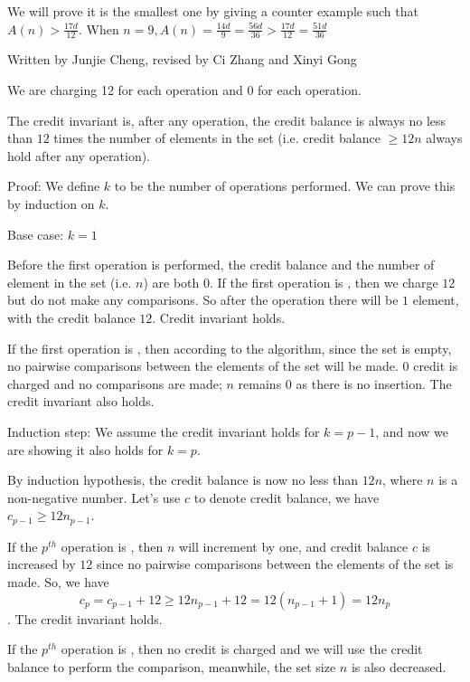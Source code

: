 \documentclass[11pt, answers]{exam}
\theoremstyle{plain}
\theoremstyle{definition}
\begin{document}
\begin{questions}
\begin{solution}
We will prove it is the smallest one by giving a counter example such that $A(n) > {\frac{17d}{12}}$. When $n = 9, A(n) = {\frac{14d}{9}} = {\frac{56d}{36}} > {\frac{17d}{12}} = {\frac{51d}{36}}$
\end{solution}


\question
\begin{solution}Written by Junjie Cheng, revised by Ci Zhang and Xinyi Gong


We are charging 12 for each  operation and 0 for each  operation.

The credit invariant is, after any operation, the credit balance is always no less than $12$ times the number of elements in the set (i.e. credit balance $\ge 12n$ always hold after any operation).

Proof: We define $k$ to be the number of operations performed. We can prove this by induction on $k$. 

Base case: $k=1$

Before the first operation is performed, the credit balance and the number of element in the set (i.e. $n$) are both $0$. If the first operation is , then we charge $12$ but do not make any comparisons. So after the operation there will be $1$ element, with the credit balance $12$. Credit invariant holds.

If the first operation is , then according to the algorithm, since the set is empty, no pairwise comparisons between the elements of the set will be made. $0$ credit is charged and no comparisons are made; $n$ remains $0$ as there is no insertion. The credit invariant also holds.

Induction step: We assume the credit invariant holds for $k=p-1$, and now we are showing it also holds for $k=p$.

By induction hypothesis, the credit balance is now no less than $12n$, where $n$ is a non-negative number. Let's use $c$ to denote credit balance, we have $c_{p-1} \ge 12n_{p-1}$.

If the $p^{th}$ operation is , then $n$ will increment by one, and credit balance $c$ is increased by $12$ since no pairwise comparisons between the elements of the set is made. So, we have $$c_p = c_{p-1} + 12 \ge 12n_{p-1} + 12 = 12(n_{p-1}+1) = 12n_p$$. The credit invariant holds.

If the $p^{th}$ operation is , then no credit is charged and we will use the credit balance to perform the comparison, meanwhile, the set size $n$ is also decreased.


\end{solution}
\end{questions}
\end{document}
